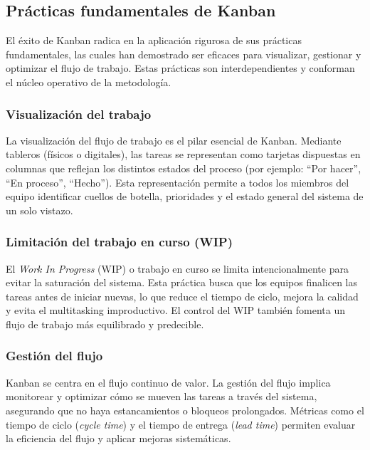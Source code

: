 \subsection{Prácticas fundamentales de Kanban}

El éxito de Kanban radica en la aplicación rigurosa de sus prácticas fundamentales, las cuales han demostrado ser eficaces para visualizar, gestionar y optimizar el flujo de trabajo. Estas prácticas son interdependientes y conforman el núcleo operativo de la metodología.

\subsubsection{Visualización del trabajo}

La visualización del flujo de trabajo es el pilar esencial de Kanban. Mediante tableros (físicos o digitales), las tareas se representan como tarjetas dispuestas en columnas que reflejan los distintos estados del proceso (por ejemplo: ``Por hacer'', ``En proceso'', ``Hecho''). Esta representación permite a todos los miembros del equipo identificar cuellos de botella, prioridades y el estado general del sistema de un solo vistazo.

\subsubsection{Limitación del trabajo en curso (WIP)}

El \textit{Work In Progress} (WIP) o trabajo en curso se limita intencionalmente para evitar la saturación del sistema. Esta práctica busca que los equipos finalicen las tareas antes de iniciar nuevas, lo que reduce el tiempo de ciclo, mejora la calidad y evita el multitasking improductivo. El control del WIP también fomenta un flujo de trabajo más equilibrado y predecible.

\subsubsection{Gestión del flujo}

Kanban se centra en el flujo continuo de valor. La gestión del flujo implica monitorear y optimizar cómo se mueven las tareas a través del sistema, asegurando que no haya estancamientos o bloqueos prolongados. Métricas como el tiempo de ciclo (\textit{cycle time}) y el tiempo de entrega (\textit{lead time}) permiten evaluar la eficiencia del flujo y aplicar mejoras sistemáticas.

